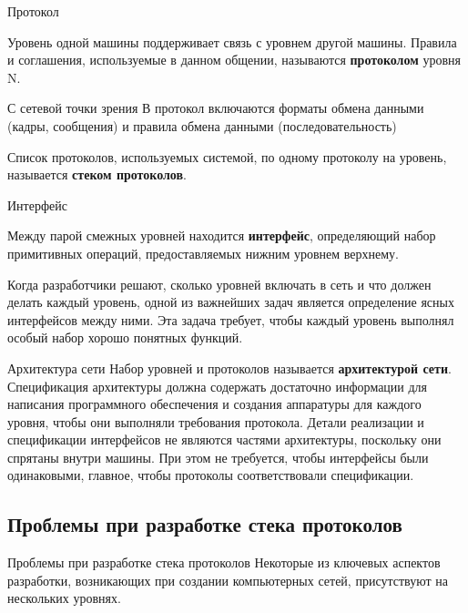 \documentclass[ignorenonframetext, hyperref={pdftex, unicode}]{beamer}
\begin{document}
\begin{frame}{Протокол}
	\begin{center}
Уровень одной машины поддерживает связь с уровнем другой машины. 
Правила и соглашения, используемые в данном общении,  называются {\bfseries протоколом} уровня N.
	\end{center}
	\begin{center}
С сетевой точки зрения В протокол включаются форматы обмена данными (кадры,  сообщения) и правила обмена данными (последовательность)
	\end{center}
	\begin{center}
		Список протоколов,  используемых системой,  по одному протоколу на уровень,  называется {\bfseries стеком протоколов}.
	\end{center}
\end{frame}

\begin{frame}{Интерфейс}
	\begin{center}
		Между парой смежных уровней находится {\bfseries интерфейс},  определяющий набор примитивных операций,  предоставляемых нижним уровнем верхнему.
	\end{center}
	\begin{center}
	Когда разработчики решают,  сколько уровней включать в сеть и что должен делать каждый уровень,  одной из важнейших задач является определение ясных интерфейсов между ними. Эта задача требует,  чтобы каждый уровень выполнял особый набор хорошо понятных функций.
	\end{center}
\end{frame}

\begin{frame}{Архитектура сети}
	Набор уровней и протоколов называется {\bfseries архитектурой сети}.
	Спецификация архитектуры должна содержать достаточно информации для написания программного обеспечения и создания аппаратуры для каждого уровня,  чтобы они выполняли требования протокола. Детали реализации и спецификации интерфейсов не являются частями архитектуры,  поскольку они спрятаны внутри машины. При этом не требуется,  чтобы интерфейсы были одинаковыми,  главное,  чтобы протоколы соответствовали спецификации.
\end{frame}

\subsection{Проблемы при разработке стека протоколов}
\begin{frame}{Проблемы при разработке стека протоколов}
	Некоторые из ключевых аспектов разработки,  возникающих при создании компьютерных сетей,  присутствуют на нескольких уровнях.
\end{frame}
\end{document}
